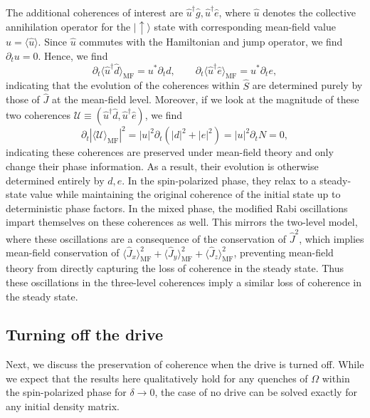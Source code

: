 \documentclass[11pt]{article}
\begin{document}
The additional coherences of interest are $\hat u^\dagger \hat g, \hat u^\dagger \hat e$, where $\hat u$ denotes the collective annihilation operator for the $|{\uparrow}\rangle$ state with corresponding mean-field value $u = \langle \hat u \rangle$. Since $\hat u$ commutes with the Hamiltonian and jump operator, we find $\partial_t u = 0$. Hence, we find
\begin{equation}
    \partial_t \langle \hat u^\dagger \hat d \rangle_{\text{MF}} = u^* \partial_t d, \qquad \partial_t \langle \hat u^\dagger \hat e \rangle_{\text{MF}} =  u^* \partial_t e,
\end{equation}
indicating that the evolution of the coherences within $\hat S$ are determined purely by those of $\hat J$ at the mean-field level. Moreover, if we look at the magnitude of these two coherences $\mathcal{U} \equiv (\hat u^\dagger \hat d, \hat u^\dagger \hat e)$, we find
\begin{equation}
    \partial_t |\langle \mathcal{U} \rangle_{\text{MF}} |^2 = |u|^2 \partial_t (|d|^2+|e|^2) = |u|^2 \partial_t N = 0,
\end{equation}
indicating these coherences are preserved under mean-field theory and only change their phase information. As a result, their evolution is otherwise determined entirely by $d, e$. In the spin-polarized phase, they relax to a steady-state value while maintaining the original coherence of the initial state up to deterministic phase factors. In the mixed phase, the modified Rabi oscillations impart themselves on these coherences as well. This mirrors the two-level model, where these oscillations are a consequence of the conservation of $\hat J^2$, which implies mean-field conservation of $\langle \hat J_x \rangle_{\text{MF}}^2 + \langle \hat J_y \rangle_{\text{MF}}^2 + \langle \hat J_z \rangle_{\text{MF}}^2$, preventing mean-field theory from directly capturing the loss of coherence in the steady state. Thus these oscillations in the three-level coherences imply a similar loss of coherence in the steady state.

\subsection{Turning off the drive}

Next, we discuss the preservation of coherence when the drive is turned off. While we expect that the results here qualitatively hold for any quenches of $\Omega$ within the spin-polarized phase for $\delta \to 0$, the case of no drive can be solved exactly for any initial density matrix. 
\end{document}
